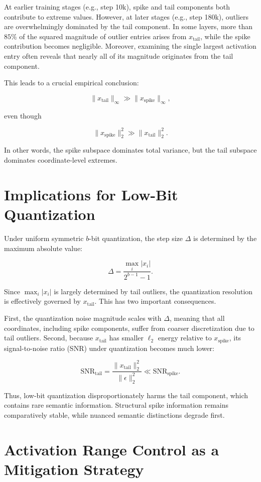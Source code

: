 At earlier training stages (e.g., step 10k), spike and tail components both contribute to extreme values. However, at later stages (e.g., step 180k), outliers are overwhelmingly dominated by the tail component. In some layers, more than $85\%$ of the squared magnitude of outlier entries arises from $x_{\text{tail}}$, while the spike contribution becomes negligible. Moreover, examining the single largest activation entry often reveals that nearly all of its magnitude originates from the tail component.

This leads to a crucial empirical conclusion:

\[
\|x_{\text{tail}}\|_\infty \gg \|x_{\text{spike}}\|_\infty,
\]

even though

\[
\|x_{\text{spike}}\|_2^2 \gg \|x_{\text{tail}}\|_2^2.
\]

In other words, the spike subspace dominates total variance, but the tail subspace dominates coordinate-level extremes.

\section{Implications for Low-Bit Quantization}

Under uniform symmetric $b$-bit quantization, the step size $\Delta$ is determined by the maximum absolute value:

\[
\Delta = \frac{\max_i |x_i|}{2^{b-1} - 1}.
\]

Since $\max_i |x_i|$ is largely determined by tail outliers, the quantization resolution is effectively governed by $x_{\text{tail}}$. This has two important consequences.

First, the quantization noise magnitude scales with $\Delta$, meaning that all coordinates, including spike components, suffer from coarser discretization due to tail outliers. Second, because $x_{\text{tail}}$ has smaller $\ell_2$ energy relative to $x_{\text{spike}}$, its signal-to-noise ratio (SNR) under quantization becomes much lower:

\[
\mathrm{SNR}_{\text{tail}} =
\frac{\|x_{\text{tail}}\|_2^2}{\|\epsilon\|_2^2}
\ll
\mathrm{SNR}_{\text{spike}}.
\]

Thus, low-bit quantization disproportionately harms the tail component, which contains rare semantic information. Structural spike information remains comparatively stable, while nuanced semantic distinctions degrade first.

\section{Activation Range Control as a Mitigation Strategy}

